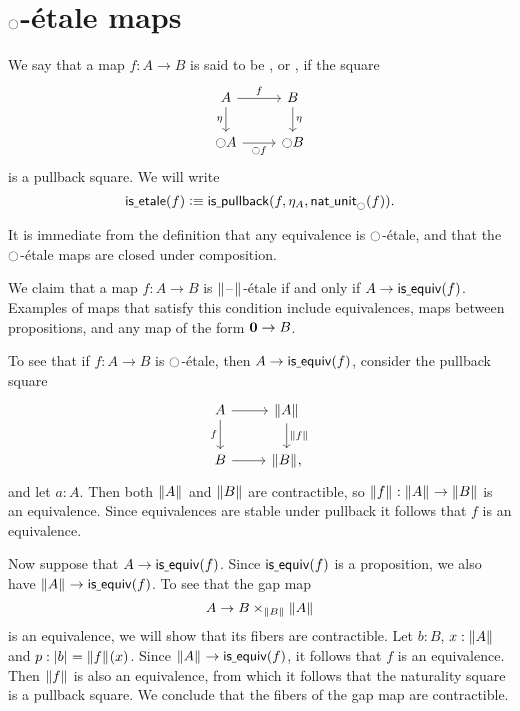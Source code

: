 \documentclass[9pt,twosided]{amsart}
\begin{document}
\section{\texorpdfstring{${\ocircle}$}{○}-\'etale maps}

\begin{defn}
We say that a map $f:A\to B$ is said to be , or , if the square
\begin{equation*}
\begin{tikzcd}
A \arrow[r,"f"] \arrow[d,swap,"\eta"] & B \arrow[d,"\eta"] \\
\modal A \arrow[r,swap,"\modal f"] & \modal B
\end{tikzcd}
\end{equation*}
is a pullback square. We will write
\begin{equation*}
\mathsf{is\underline{\ }{}etale}(f)\vcentcolon\equiv\mathsf{is\underline{\ }{}pullback}(f,\eta_A,\mathsf{nat\underline{\ }{}unit}_{\ocircle}(f)).
\end{equation*}
\end{defn}

It is immediate from the definition that any equivalence is ${\ocircle}$-\'etale, and that the ${\ocircle}$-\'etale maps are closed under composition.

\begin{eg}\label{eg:etale_prop}
We claim that a map $f:A\to B$ is $\brck{\blank}$-\'etale if and only if $A\to \mathsf{is\underline{\ }{}equiv}(f)$. Examples of maps that satisfy this condition include equivalences, maps between propositions, and any map of the form $\mathbf{0}\to B$.

To see that if $f:A\to B$ is ${\ocircle}$-\'etale, then $A\to\mathsf{is\underline{\ }{}equiv}(f)$, consider the pullback square
\begin{equation*}
\begin{tikzcd}
A \arrow[r] \arrow[d,swap,"f"] & \brck{A} \arrow[d,"\brck{f}"] \\
B \arrow[r] & \brck{B},
\end{tikzcd}
\end{equation*}
and let $a:A$. Then both $\brck{A}$ and $\brck{B}$ are contractible, so $\brck{f}:\brck{A}\to\brck{B}$ is an equivalence. Since equivalences are stable under pullback it follows that $f$ is an equivalence.

Now suppose that $A\to \mathsf{is\underline{\ }{}equiv}(f)$. Since $\mathsf{is\underline{\ }{}equiv}(f)$ is a proposition, we also have $\brck{A}\to\isequiv(f)$. To see that the gap map
\begin{equation*}
A \to B\times_{\brck{B}}\brck{A}
\end{equation*}
is an equivalence, we will show that its fibers are contractible. Let $b:B$, $x:\brck{A}$ and $p:\bproj{b}=\brck{f}(x)$. Since $\brck{A}\to\isequiv(f)$, it follows that $f$ is an equivalence. Then $\brck{f}$ is also an equivalence, from which it follows that the naturality square is a pullback square. We conclude that the fibers of the gap map are contractible. 
\end{eg}
\end{document}
